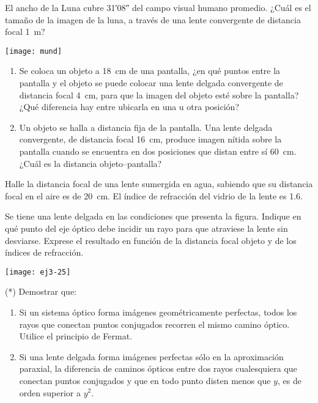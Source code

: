 \item 
\begin{minipage}[t][2cm]{0.55\textwidth}
El ancho de la Luna cubre \ang{;31;08} del campo visual humano promedio.
¿Cuál es el tamaño de la imagen de la luna, a través de una lente convergente de distancia focal \SI{1}{\metre}?
\end{minipage}
\begin{minipage}[c][1cm][t]{0.4\textwidth}
	\texttt{[image: mund]}
\end{minipage}



\item
\begin{enumerate}
	\item Se coloca un objeto a \SI{18}{\centi\metre} de una pantalla, ¿en qué puntos entre la pantalla y el objeto se puede colocar una lente delgada convergente de distancia focal \SI{4}{\centi\metre}, para que la imagen del objeto esté sobre la pantalla? ¿Qué diferencia hay entre ubicarla en una u otra posición?
	\item Un objeto se halla a distancia fija de la pantalla. Una lente delgada convergente, de distancia focal \SI{16}{\centi\metre}, produce imagen nítida sobre la pantalla cuando se encuentra en dos posiciones que distan entre sí \SI{60}{\centi\metre}.
¿Cuál es la distancia objeto--pantalla?
\end{enumerate}



\item Halle la distancia focal de una lente sumergida en agua, sabiendo que su distancia focal en el aire es de \SI{20}{\centi\metre}.
El índice de refracción del vidrio de la lente es \num{1.6}. 



\item
\begin{minipage}[t][2cm]{0.65\textwidth}
Se tiene una lente delgada en las condiciones que presenta la figura.
Indique en qué punto del eje óptico debe incidir un rayo para que atraviese la lente sin desviarse.
Exprese el resultado en función de la distancia focal objeto y de los índices de refracción.
\end{minipage}
\begin{minipage}[c][0.4cm][t]{0.3\textwidth}
	\texttt{[image: ej3-25]}
\end{minipage}


\item (*) Demostrar que:
\begin{enumerate}
	\item Si un sistema óptico forma imágenes geométricamente perfectas, todos los rayos que conectan puntos conjugados recorren el mismo camino óptico.
	Utilice el principio de Fermat.
	\item Si una lente delgada forma imágenes perfectas sólo en la aproximación paraxial, la diferencia de caminos ópticos entre dos rayos cualesquiera que conectan puntos conjugados y que en todo punto disten menos que $y$, es de orden superior a $y^2$.
\end{enumerate}


